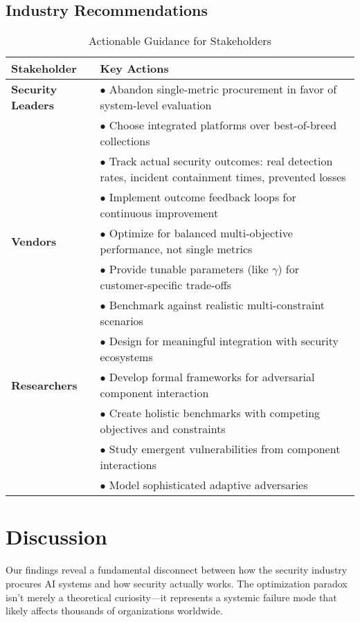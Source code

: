 \documentclass[10pt,conference]{IEEEtran}
\begin{document}
\subsection{Industry Recommendations}

\begin{table*}[!ht]
\centering
\caption{Actionable Guidance for Stakeholders}
\footnotesize
\begin{tabular}{@{}lp{11cm}@{}}
\toprule
\textbf{Stakeholder} & \textbf{Key Actions} \\
\midrule
\textbf{Security Leaders} &
$\bullet$ Abandon single-metric procurement in favor of system-level evaluation\\
& $\bullet$ Choose integrated platforms over best-of-breed collections\\
& $\bullet$ Track actual security outcomes: real detection rates, incident containment times, prevented losses\\
& $\bullet$ Implement outcome feedback loops for continuous improvement\\
\midrule
\textbf{Vendors} &
$\bullet$ Optimize for balanced multi-objective performance, not single metrics\\
& $\bullet$ Provide tunable parameters (like $\gamma$) for customer-specific trade-offs\\
& $\bullet$ Benchmark against realistic multi-constraint scenarios\\
& $\bullet$ Design for meaningful integration with security ecosystems\\
\midrule
\textbf{Researchers} &
$\bullet$ Develop formal frameworks for adversarial component interaction\\
& $\bullet$ Create holistic benchmarks with competing objectives and constraints\\
& $\bullet$ Study emergent vulnerabilities from component interactions\\
& $\bullet$ Model sophisticated adaptive adversaries\\
\bottomrule
\end{tabular}
\end{table*}

\section{Discussion}

Our findings reveal a fundamental disconnect between how the security industry procures AI systems and how security actually works. The optimization paradox isn't merely a theoretical curiosity---it represents a systemic failure mode that likely affects thousands of organizations worldwide.
\end{document}
